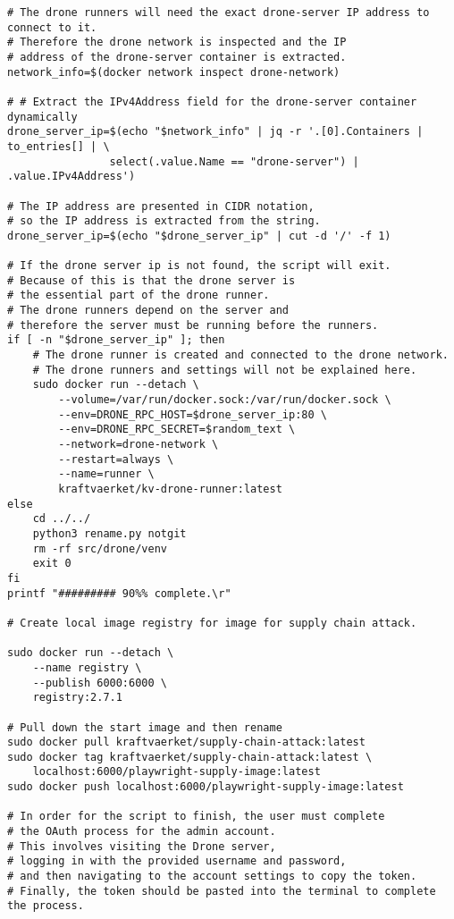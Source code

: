 \begin{verbatim}
# The drone runners will need the exact drone-server IP address to connect to it.
# Therefore the drone network is inspected and the IP 
# address of the drone-server container is extracted.
network_info=$(docker network inspect drone-network)

# # Extract the IPv4Address field for the drone-server container dynamically
drone_server_ip=$(echo "$network_info" | jq -r '.[0].Containers | to_entries[] | \ 
                select(.value.Name == "drone-server") | .value.IPv4Address')

# The IP address are presented in CIDR notation, 
# so the IP address is extracted from the string.
drone_server_ip=$(echo "$drone_server_ip" | cut -d '/' -f 1)

# If the drone server ip is not found, the script will exit.
# Because of this is that the drone server is 
# the essential part of the drone runner.
# The drone runners depend on the server and 
# therefore the server must be running before the runners.
if [ -n "$drone_server_ip" ]; then
    # The drone runner is created and connected to the drone network.
    # The drone runners and settings will not be explained here.
    sudo docker run --detach \
        --volume=/var/run/docker.sock:/var/run/docker.sock \
        --env=DRONE_RPC_HOST=$drone_server_ip:80 \
        --env=DRONE_RPC_SECRET=$random_text \
        --network=drone-network \
        --restart=always \
        --name=runner \
        kraftvaerket/kv-drone-runner:latest
else
    cd ../../
    python3 rename.py notgit
    rm -rf src/drone/venv
    exit 0
fi
printf "######### 90%% complete.\r"

# Create local image registry for image for supply chain attack.

sudo docker run --detach \
    --name registry \
    --publish 6000:6000 \
    registry:2.7.1

# Pull down the start image and then rename 
sudo docker pull kraftvaerket/supply-chain-attack:latest
sudo docker tag kraftvaerket/supply-chain-attack:latest \
    localhost:6000/playwright-supply-image:latest
sudo docker push localhost:6000/playwright-supply-image:latest

# In order for the script to finish, the user must complete 
# the OAuth process for the admin account. 
# This involves visiting the Drone server, 
# logging in with the provided username and password, 
# and then navigating to the account settings to copy the token. 
# Finally, the token should be pasted into the terminal to complete the process.


\end{verbatim}
